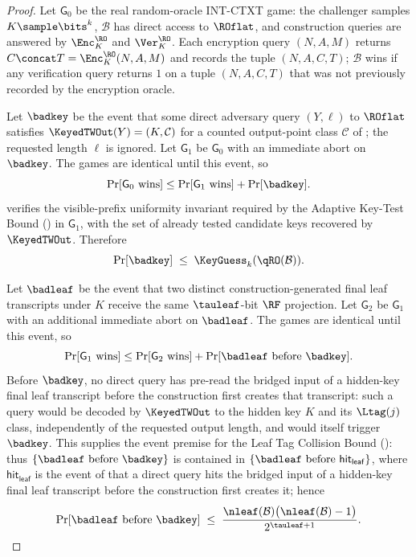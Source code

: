 \begin{proof}
Let $\mathsf{G}_0$ be the real random-oracle INT-CTXT game: the
challenger samples $K \sample \bits^k$, $\mathcal{B}$ has direct
access to $\ROflat$, and construction queries are answered by
$\Enc_K^\RO$ and $\Ver_K^\RO$. Each encryption query
$(N, A, M)$ returns $C \concat T = \Enc_K^\RO(N, A, M)$ and records the
tuple $(N, A, C, T)$; $\mathcal{B}$ wins if any verification query
returns $1$ on a tuple $(N, A, C, T)$ that was not previously
recorded by the encryption oracle.

Let $\badkey$ be the event that some direct
adversary query $(Y,\ell)$ to $\ROflat$ satisfies
$\KeyedTWOut(Y) = (K,\mathcal{C})$ for a counted output-point class
$\mathcal{C}$ of ; the requested length $\ell$
is ignored. Let $\mathsf{G}_1$ be $\mathsf{G}_0$ with an immediate
abort on $\badkey$. The games are identical until
this event, so
\[
  \Pr[\mathsf{G}_0 \text{ wins}]
  \leq
  \Pr[\mathsf{G}_1 \text{ wins}]
  + \Pr[\badkey].
\]
 verifies the visible-prefix uniformity
invariant required by the Adaptive Key-Test Bound
() in $\mathsf{G}_1$, with the set of already
tested candidate keys recovered by $\KeyedTWOut$. Therefore
\[
  \Pr[\badkey]
  \;\leq\; \KeyGuess_k(\qRO(\mathcal{B})).
\]

Let $\badleaf$ be the event that two distinct
construction-generated final leaf transcripts under $K$ receive the
same $\tauleaf$-bit $\RF$ projection. Let $\mathsf{G}_2$ be
$\mathsf{G}_1$ with an additional immediate abort on
$\badleaf$. The games are identical until this
event, so
\[
  \Pr[\mathsf{G}_1 \text{ wins}]
  \leq
  \Pr[\mathsf{G}_2 \text{ wins}]
  + \Pr[\badleaf \text{ before }
        \badkey].
\]
Before $\badkey$, no direct query has pre-read the bridged input of a
hidden-key final leaf transcript before the construction first creates
that transcript: such a query would be decoded by $\KeyedTWOut$ to the
hidden key $K$ and its $\Ltag(j)$ class, independently of the requested
output length, and would itself trigger $\badkey$. This supplies the
event premise for the Leaf Tag Collision Bound
(): thus
$\{\badleaf \text{ before }
\badkey\}$ is contained in
$\{\badleaf \text{ before }
\mathsf{hit}_{\mathsf{leaf}}\}$, where $\mathsf{hit}_{\mathsf{leaf}}$
is the event of  that a direct query hits the
bridged input of a hidden-key final leaf transcript before the
construction first creates it; hence
\[
  \Pr[\badleaf \text{ before }
      \badkey]
  \;\leq\;
  \frac{\nleaf(\mathcal{B})\bigl(\nleaf(\mathcal{B}) - 1\bigr)}{2^{\tauleaf + 1}}.
\]


\end{proof}
